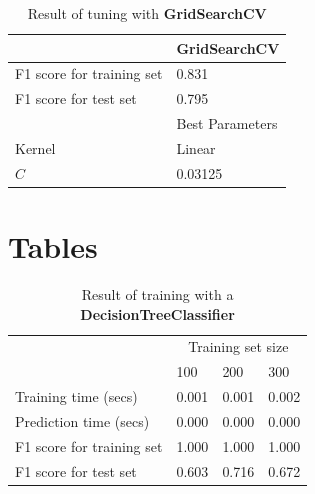 \documentclass[12pt]{article}
\begin{document}
\setlength{\extrarowheight}{1.5pt}
\begin{table}[!htbp]
\caption{Result of tuning with \textbf{GridSearchCV}} %
\centering %
\begin{tabular}{|p{4cm}||p{4cm}|} %
\hline %
& GridSearchCV\\[0.5ex]
\hline %

F1 score for training set     &0.831\\
F1 score for test set         &0.795\\

\hline %
& Best Parameters \\[1ex]
\hline %

Kernel & Linear\\
$C$ & 0.03125\\
\hline %
\end{tabular}
\label{tunedGridSearch}
\end{table}









\section*{Tables}

\setlength{\extrarowheight}{1.5pt}
\begin{table}[!htbp]
\caption{Result of training with a \textbf{DecisionTreeClassifier}} %
\centering %
\begin{tabular}{|p{6cm}|p{1.5cm}|p{1.5cm}|p{1.5cm}|} %
\hline %
& \multicolumn{3}{c|}{Training set size}\\[5pt]
\cline{2-4} 
& 100 & 200 & 300\\[0.5ex]
\hline %

Training time (secs)          &  0.001&  0.001&  0.002\\ 
Prediction time (secs)        &  0.000&  0.000&  0.000\\ 
F1 score for training set     &  1.000&  1.000&  1.000\\ 
F1 score for test set         &  0.603&  0.716&  0.672\\

\hline %
\end{tabular}
\label{decisionTreeTable}
\end{table}
\end{document}
